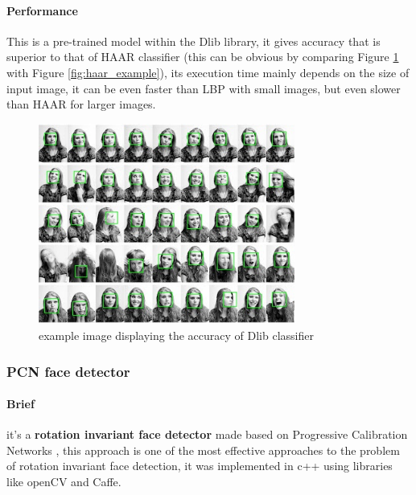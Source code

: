 \paragraph{Performance}
This is a pre-trained model within the Dlib library, it gives accuracy that is superior to that of HAAR classifier (this can be obvious by comparing Figure \ref{fig:dlib_example} with Figure \ref{fig:haar_example}), its execution time mainly depends on the size of input image, it can be even faster than LBP with small images, but even slower than HAAR for larger images.


\begin{figure}
	\centering
	\includegraphics[width=0.75\textwidth]{images/dlib_example.jpg}
	\caption{example image displaying the accuracy of Dlib classifier}
	\label{fig:dlib_example}
\end{figure}

\subsubsection{PCN face detector}
\paragraph{Brief}
it's a \textbf{rotation invariant face detector} made based on Progressive Calibration Networks \cite{PCN}, this approach is one of the most effective approaches to the problem of rotation invariant face detection, it was implemented in c++ using libraries like openCV and Caffe.
